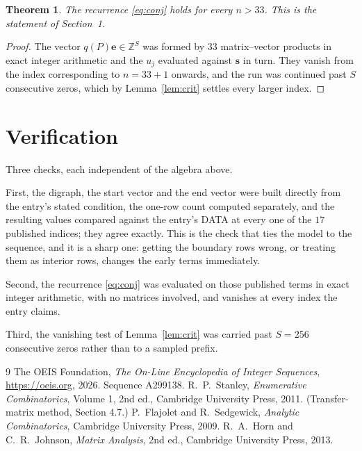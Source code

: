 \documentclass[11pt,a4paper]{article}
\theoremstyle{plain}
\newtheorem{theorem}{Theorem}
\theoremstyle{definition}
\begin{document}
\begin{theorem}
The recurrence \eqref{eq:conj} holds for every $n>33$. This is the statement of
Section~1.
\end{theorem}

\begin{proof}
The vector $q(P)\mathbf{e}\in\mathbb{Z}^{S}$ was formed by $33$ matrix--vector
products in exact integer arithmetic and the $u_j$ evaluated against $\mathbf{s}$ in turn.
They vanish from the index corresponding to $n=33+1$ onwards, and the run was continued
past $S$ consecutive zeros, which by Lemma~\ref{lem:crit} settles every larger index.
\end{proof}

\section{Verification}

Three checks, each independent of the algebra above.

First, the digraph, the start vector and the end vector were built directly from the
entry's stated condition, the one-row count computed separately, and the resulting values
compared against the entry's DATA at every one of the $17$ published indices; they
agree exactly. This is the check that ties the model to the sequence, and it is a sharp one:
getting the boundary rows wrong, or treating them as interior rows, changes the early terms
immediately.

Second, the recurrence \eqref{eq:conj} was evaluated on those published terms in exact
integer arithmetic, with no matrices involved, and vanishes at every index the entry claims.

Third, the vanishing test of Lemma~\ref{lem:crit} was carried past $S=256$ consecutive
zeros rather than to a sampled prefix.

\begin{thebibliography}{9}
 The OEIS Foundation, \emph{The On-Line Encyclopedia of Integer
Sequences}, \url{https://oeis.org}, 2026. Sequence A299138.
 R.~P.~Stanley, \emph{Enumerative Combinatorics}, Volume 1, 2nd ed.,
Cambridge University Press, 2011. (Transfer-matrix method, Section 4.7.)
 P.~Flajolet and R.~Sedgewick, \emph{Analytic Combinatorics}, Cambridge
University Press, 2009.
 R.~A.~Horn and C.~R.~Johnson, \emph{Matrix Analysis}, 2nd ed., Cambridge
University Press, 2013.
\end{thebibliography}
\end{document}
